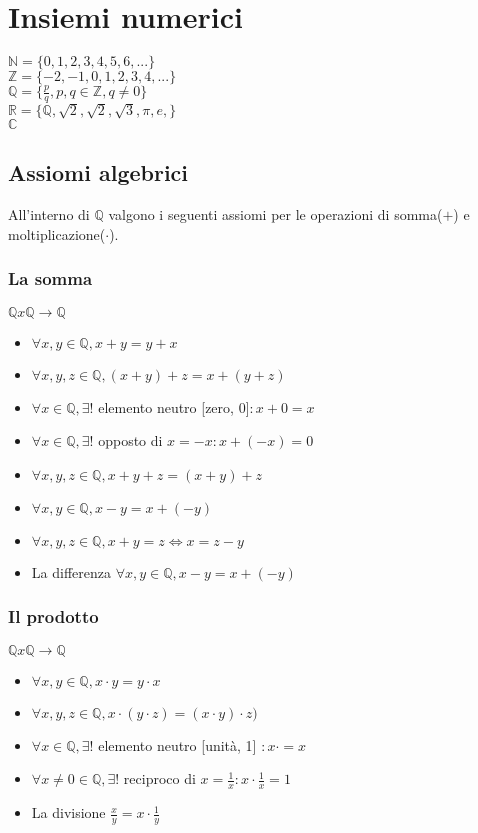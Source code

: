 \chapter{Insiemi numerici}
$\mathbb{N}=\{0, 1, 2, 3, 4, 5, 6, ... \}$\\
$\mathbb{Z}=\{ -2, -1, 0, 1, 2, 3, 4, ...\}$\\
$\mathbb{Q}=\{ \frac{p}{q}, p,q \in \mathbb{Z}, q\ne 0\}$\\
$\mathbb{R}=\{\mathbb{Q}, \sqrt{2}, \sqrt{2}, \sqrt{3}, \pi, e,\}$\\
$\mathbb{C}$
\section{Assiomi algebrici}
All'interno di $\mathbb{Q}$ valgono i seguenti assiomi per le operazioni di somma($+$) e moltiplicazione($\cdot$).\\
\subsection{La somma}
$\mathbb{Q}x\mathbb{Q}\rightarrow\mathbb{Q}$
\begin{itemize}
\item $\forall x, y \in \mathbb{Q}, x+y=y+x$
\item $\forall x, y, z \in \mathbb{Q}, (x+y)+z=x+(y+z)$
\item $\forall x\in \mathbb{Q}, \exists !$ elemento neutro [zero, 0]$: x+0=x$
\item $\forall x\in \mathbb{Q}, \exists !$ opposto di $x=-x : x+(-x)=0$
\item $\forall x, y, z \in \mathbb{Q}, x+y+z=(x+y)+z$
\item $\forall x, y \in \mathbb{Q}, x-y=x+(-y)$
\item $\forall x, y, z \in \mathbb{Q}, x+y=z \Leftrightarrow x=z-y$
\item La differenza $\forall x, y\in \mathbb{Q}, x-y=x+(-y)$
\end{itemize}
\subsection{Il prodotto}
$\mathbb{Q}x\mathbb{Q}\rightarrow\mathbb{Q}$
\begin{itemize}
\item $\forall x, y \in \mathbb{Q}, x\cdot y=y\cdot x$
\item $\forall x, y, z \in \mathbb{Q}, x\cdot(y\cdot z)=(x\cdot y)\cdot z)$
\item $\forall x\in \mathbb{Q}, \exists !$ elemento neutro [unit\`a, 1] $: x\cdot =x $
\item $\forall x\ne 0\in \mathbb{Q}, \exists !$ reciproco di $x=\frac{1}{x} : x\cdot\frac{1}{x}=1$
\item La divisione $\frac{x}{y}=x\cdot\frac{1}{y}$  
\end{itemize}
